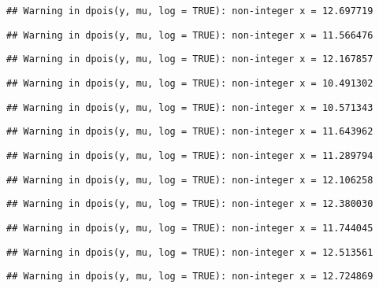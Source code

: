 \documentclass[
]{article}
\begin{document}
\begin{verbatim}
## Warning in dpois(y, mu, log = TRUE): non-integer x = 12.697719
\end{verbatim}

\begin{verbatim}
## Warning in dpois(y, mu, log = TRUE): non-integer x = 11.566476
\end{verbatim}

\begin{verbatim}
## Warning in dpois(y, mu, log = TRUE): non-integer x = 12.167857
\end{verbatim}

\begin{verbatim}
## Warning in dpois(y, mu, log = TRUE): non-integer x = 10.491302
\end{verbatim}

\begin{verbatim}
## Warning in dpois(y, mu, log = TRUE): non-integer x = 10.571343
\end{verbatim}

\begin{verbatim}
## Warning in dpois(y, mu, log = TRUE): non-integer x = 11.643962
\end{verbatim}

\begin{verbatim}
## Warning in dpois(y, mu, log = TRUE): non-integer x = 11.289794
\end{verbatim}

\begin{verbatim}
## Warning in dpois(y, mu, log = TRUE): non-integer x = 12.106258
\end{verbatim}

\begin{verbatim}
## Warning in dpois(y, mu, log = TRUE): non-integer x = 12.380030
\end{verbatim}

\begin{verbatim}
## Warning in dpois(y, mu, log = TRUE): non-integer x = 11.744045
\end{verbatim}

\begin{verbatim}
## Warning in dpois(y, mu, log = TRUE): non-integer x = 12.513561
\end{verbatim}

\begin{verbatim}
## Warning in dpois(y, mu, log = TRUE): non-integer x = 12.724869
\end{verbatim}
\end{document}
